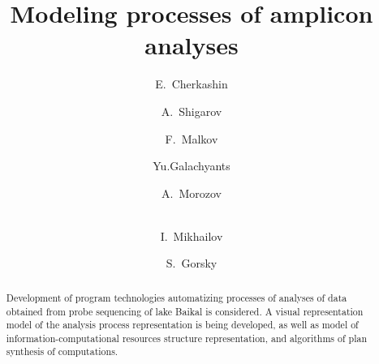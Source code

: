 \documentclass[12pt]{llncs}
\begin{document}
\begin{englishtitle}

\title{Modeling  processes of amplicon analyses}

\author{E.~Cherkashin
  \and
  A.~Shigarov \and
  F.~Malkov \and
  Yu.Galachyants \and
  A.~Morozov \and\\
  I.~Mikhailov \and
  S.~Gorsky
}



\maketitle
\begin{abstract}
Development of program technologies automatizing processes of analyses of data obtained from probe sequencing of lake Baikal is considered.  A visual representation model of the analysis process representation is being developed, as well as model of information-computational resources structure representation, and algorithms of plan synthesis of computations.

\end{abstract}
\end{englishtitle}
\end{document}
